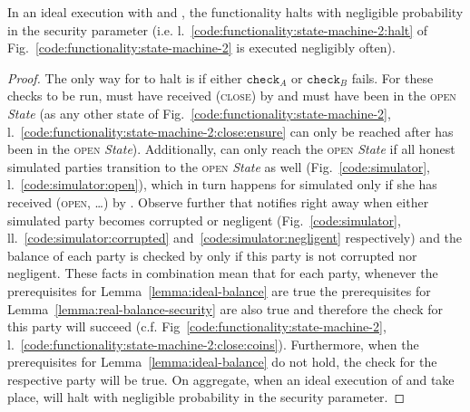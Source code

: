\begin{lemma}[No halt]
\label{lemma:no-halt}
  In an ideal execution with \fchan and \simulator, the functionality halts with
  negligible probability in the security parameter (i.e.
  l.~\ref{code:functionality:state-machine-2:halt} of
  Fig.~\ref{code:functionality:state-machine-2} is executed negligibly often).
\end{lemma}

\begin{proof}
  The only way for \fchan to halt is if either $\texttt{check}_A$ or
  $\texttt{check}_B$ fails. For these checks to be run, \fchan must have
  received (\textsc{close}) by \simulator and must have been in the
  \textsc{open} \textit{State} (as any other state of
  Fig.~\ref{code:functionality:state-machine-2},
  l.~\ref{code:functionality:state-machine-2:close:ensure} can only be reached
  after \fchan has been in the \textsc{open} \textit{State}). Additionally,
  \fchan can only reach the \textsc{open} \textit{State} if all honest simulated
  parties transition to the \textsc{open} \textit{State} as well
  (Fig.~\ref{code:simulator}, l.~\ref{code:simulator:open}), which in turn
  happens for simulated \alice only if she has received (\textsc{open}, \dots)
  by \environment. Observe further that \simulator notifies \fchan right away
  when either simulated party becomes corrupted or negligent
  (Fig.~\ref{code:simulator}, ll.~\ref{code:simulator:corrupted}
  and~\ref{code:simulator:negligent} respectively) and the balance of each party
  is checked by \fchan only if this party is not corrupted nor negligent. These
  facts in combination mean that for each party, whenever the prerequisites for
  Lemma~\ref{lemma:ideal-balance} are true the prerequisites for
  Lemma~\ref{lemma:real-balance-security} are also true and therefore the check
  for this party will succeed (c.f.
  Fig~\ref{code:functionality:state-machine-2},
  l.~\ref{code:functionality:state-machine-2:close:coins}). Furthermore, when
  the prerequisites for Lemma~\ref{lemma:ideal-balance} do not hold, the check
  for the respective party will be true. On aggregate, when an ideal execution
  of \fchan and \simulator take place, \fchan will halt with negligible
  probability in the security parameter.
\end{proof}
